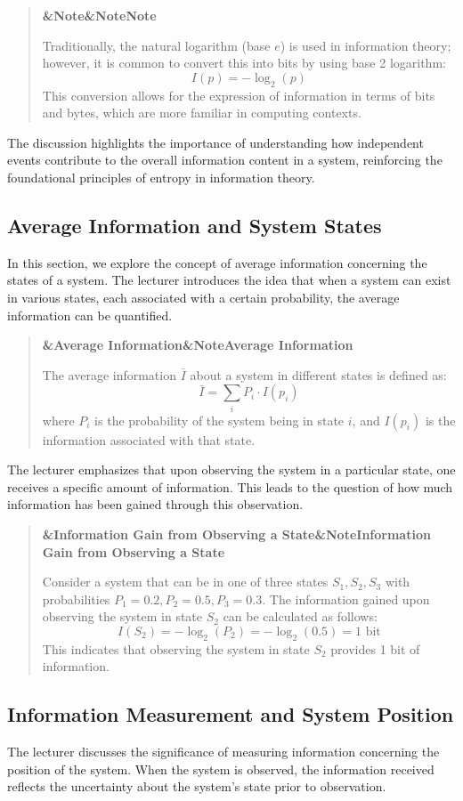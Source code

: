 \documentclass[a4paper]{article}
\newcommand{\boxheading}[1]{%
  \par\smallskip
  \noindent\textbf{\ifx&#1&Note\else#1\fi}\par
  \smallskip
}
\newenvironment{defbox}[1][]{%
  \begin{quote}\color{green!40!black}\boxheading{#1}\normalcolor
}{\end{quote}}
\newenvironment{exbox}[1][]{%
  \begin{quote}\color{brown!70!black}\boxheading{#1}\normalcolor
}{\end{quote}}
\newenvironment{rembox}[1][]{%
  \begin{quote}\color{black!70}\boxheading{#1}\normalcolor
}{\end{quote}}
\begin{document}
\begin{rembox}[Note]
Traditionally, the natural logarithm (base \( e \)) is used in information theory; however, it is common to convert this into bits by using base 2 logarithm:
\[
I(p) = -\log_2(p)
\]
This conversion allows for the expression of information in terms of bits and bytes, which are more familiar in computing contexts.
\end{rembox}

The discussion highlights the importance of understanding how independent events contribute to the overall information content in a system, reinforcing the foundational principles of entropy in information theory.

\subsection{Average Information and System States}
In this section, we explore the concept of average information concerning the states of a system. The lecturer introduces the idea that when a system can exist in various states, each associated with a certain probability, the average information can be quantified.

\begin{defbox}[Average Information]
The average information \( \bar{I} \) about a system in different states is defined as:
\[
\bar{I} = \sum_{i} P_i \cdot I(p_i)
\]
where \( P_i \) is the probability of the system being in state \( i \), and \( I(p_i) \) is the information associated with that state.
\end{defbox}

The lecturer emphasizes that upon observing the system in a particular state, one receives a specific amount of information. This leads to the question of how much information has been gained through this observation.

\begin{exbox}[Information Gain from Observing a State]
Consider a system that can be in one of three states \( S_1, S_2, S_3 \) with probabilities \( P_1 = 0.2, P_2 = 0.5, P_3 = 0.3 \). The information gained upon observing the system in state \( S_2 \) can be calculated as follows:
\[
I(S_2) = -\log_2(P_2) = -\log_2(0.5) = 1 \text{ bit}
\]
This indicates that observing the system in state \( S_2 \) provides 1 bit of information.
\end{exbox}

\subsection{Information Measurement and System Position}
The lecturer discusses the significance of measuring information concerning the position of the system. When the system is observed, the information received reflects the uncertainty about the system's state prior to observation.
\end{document}
